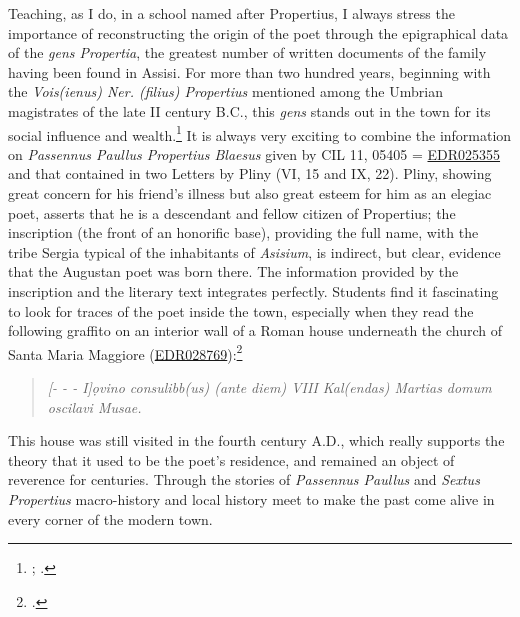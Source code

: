 \documentclass[amsthm,ebook]{saparticle}
\begin{document}
Teaching, as I do, in a school named after Propertius, I always stress the importance of reconstructing the origin of
the poet through the epigraphical data of the \emph{gens Propertia}, the greatest number of written documents of the family
having been found in Assisi. For more than two hundred years, beginning with the \emph{Vois(ienus) Ner. (filius) Propertius}
mentioned among the Umbrian magistrates of the late II century B.C., this \emph{gens} stands out in the town for its social
influence and wealth.\footnote{\citet{Forni1986}; \citet{Zuddas2006}.} It is always very exciting to combine the information on
\emph{Passennus Paullus Propertius Blaesus }given by CIL 11, 05405 = \href{http://www.edr-edr.it/edr\_programmi/res\_complex\_comune.php?do=book\&id\_nr=EDR025355}{EDR025355} and that contained in two Letters by Pliny (VI,
15 and IX, 22). Pliny, showing great concern for his friend’s illness but also great esteem for him as an elegiac poet,
asserts that he is a descendant and fellow citizen of Propertius; the inscription (the front of an honorific base),
providing the full name, with the tribe Sergia typical of the inhabitants of \emph{Asisium}, is indirect, but clear, evidence
that the Augustan poet was born there. The information provided by the inscription and the literary text integrates
perfectly. Students find it fascinating to look for traces of the poet inside the town, especially when they read the
following graffito on an interior wall of a Roman house underneath the church of Santa Maria Maggiore (\href{http://www.edr-edr.it/edr\_programmi/res\_complex\_comune.php?do=book\&id\_nr=EDR028769}{EDR028769}):\footnote{\citet[244-246]{Boldrighini2014}.}
\newpage
\begin{quotation}

\emph{[{}- - - I]ọvino consulibb(us) (ante diem) VIII Kal(endas) Martias domum oscilavi Musae.}
\end{quotation}

This house was still visited in the fourth century A.D., which really supports the theory that it used to be the poet’s
residence, and remained an object of reverence for centuries. Through the stories
of \emph{Passennus Paullus} and \emph{Sextus Propertius} macro-history and local history meet to make the past come alive in every
corner of the modern town.



\end{document}
